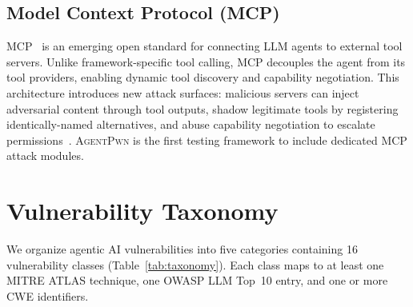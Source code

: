 \documentclass[letterpaper,twocolumn,10pt]{article}
\newcommand{\apwn}{\textsc{AgentPwn}}
\newcommand{\Tref}[1]{Table~\ref{#1}}
\begin{document}
\subsection{Model Context Protocol (MCP)}

MCP~\citep{mcp2024spec} is an emerging open standard for connecting LLM agents to external tool servers.
Unlike framework-specific tool calling, MCP decouples the agent from its tool providers, enabling dynamic tool discovery and capability negotiation.
This architecture introduces new attack surfaces: malicious servers can inject adversarial content through tool outputs, shadow legitimate tools by registering identically-named alternatives, and abuse capability negotiation to escalate permissions~\citep{gu2024mcp}.
\apwn{} is the first testing framework to include dedicated MCP attack modules.


\section{Vulnerability Taxonomy}
\label{sec:taxonomy}

We organize agentic AI vulnerabilities into five categories containing 16 vulnerability classes (\Tref{tab:taxonomy}).
Each class maps to at least one MITRE ATLAS technique, one OWASP LLM Top~10 entry, and one or more CWE identifiers.
\end{document}
